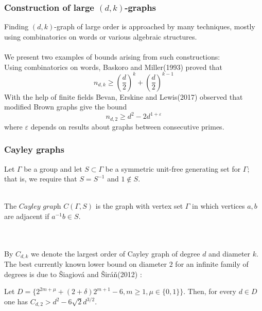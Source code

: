 \documentclass{beamer}
\begin{document}
\begin{frame}
	\frametitle{Construction of large $(d,k)$-graphs}
	Finding $(d,k)$-graph of large order is approached by many techniques, mostly using combinatorics on words or various algebraic structures. \\~\\
    We present two examples of bounds arising from such constructions: ~\\
	Using combinatorics on words, Baskoro and Miller(1993) \cite{Bas-Mil} proved that 
    \begin{equation*}
        n_{d,k} \geq \left( \frac{d}{2} \right)^{k} +  \left( \frac{d}{2} \right)^{k-1}     
	\end{equation*}
	With the help of finite fields Bevan, Erskine and Lewis(2017) \cite{Bev-Ers} observed that modified Brown graphs give the bound
    \begin{equation*}
		n_{d,2} \geq d^{2} - 2d^{1+\varepsilon}     
	\end{equation*}
	where $\varepsilon$ depends on results about graphs between consecutive primes.	
\end{frame}
\begin{frame}
	\frametitle{Cayley graphs}
	Let $\Gamma$ be a group and let $S\subset \Gamma$ be a symmetric unit-free generating set for $\Gamma$; that is, we require that $S=S^{-1}$ and $1\notin S$.\\~\\
	\begin{definition}
		The $\textit{Cayley graph}$ $C(\Gamma,S)$ is the graph with vertex set $\Gamma$ in which vertices $a,b$ are adjacent if $a^{-1}b\in S$.	
	\end{definition} ~\\~\\
	By $C_{d,k}$ we denote the largest order of Cayley graph of degree $d$ and diameter $k$.
	The best currently known lower bound on diameter $2$ for an infinite family of degrees is due to \v{S}iagiov\'a and \v{S}ir\'a\v{n}(2012) \cite{Sia-Sir}: 
	\begin{theorem}
	Let $D = \{ 2^{2m+\mu}+    (2+\delta)2^{m+1}-6,m \geq 1, \mu \in \{0,1\} \}$. Then, for every $d\in D$ one has $C_{d,2} > d^{2} - 6\sqrt{2}d^{3/2}$.
	\end{theorem}
\end{frame}
\end{document}
